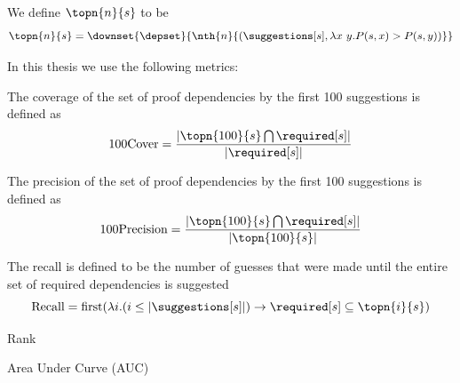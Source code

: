 \begin{definition} We define $\topn{n}{s}$ to be
  \[ \topn{n}{s} = \downset{\depset}{\nth{n}{(\suggestions[s], \lambda x~y. P(s, x) > P(s, y))}} \]
\end{definition}

In this thesis we use the following metrics:
\begin{definition}
  The coverage of the set of proof dependencies by the first 100 suggestions is defined as
  \[ \text{100Cover} = \frac{ |\topn{100}{s} \bigcap \required[s]| } { |\required[s]| } \]
\end{definition}

\begin{definition}
  The precision of the set of proof dependencies by the first 100 suggestions is defined as
  \[ \text{100Precision} = \frac{ |\topn{100}{s} \bigcap \required[s]| } { |\topn{100}{s}| } \]
\end{definition}

\begin{definition}
  The recall is defined to be the number of guesses that were made until the entire set of required dependencies is suggested
  \[ \text{Recall} =  \text{first}(\lambda i. (i \leq |\suggestions[s]|) \rightarrow \required[s] \subseteq \topn{i}{s}) \]
\end{definition}

\begin{definition}{Rank}
\end{definition}

\begin{definition}{Area Under Curve (AUC)}
\end{definition}
